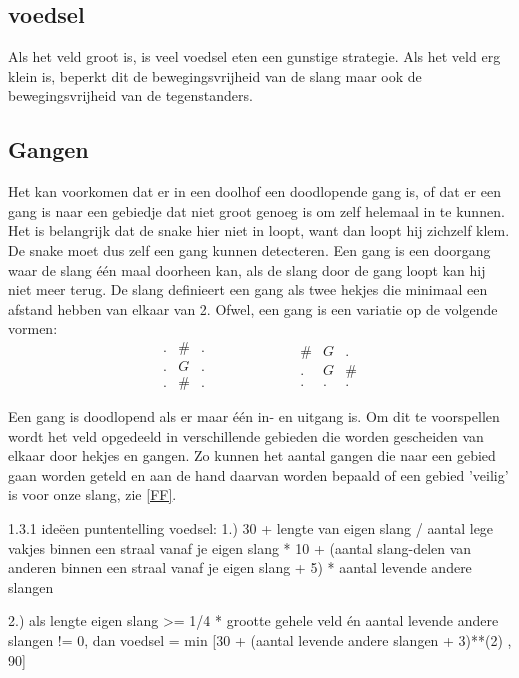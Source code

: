 \documentclass{article}
\begin{document}
\subsection{voedsel}
Als het veld groot is, is veel voedsel eten een gunstige strategie. Als het veld erg klein is, beperkt dit de bewegingsvrijheid van de slang maar ook de bewegingsvrijheid van de tegenstanders.


\subsection{Gangen\label{Gangen}}
Het kan voorkomen dat er in een doolhof een doodlopende gang is, of dat er een gang is naar een gebiedje dat niet groot genoeg is om zelf helemaal in te kunnen. Het is belangrijk dat de snake hier niet in loopt, want dan loopt hij zichzelf klem. De snake moet dus zelf een gang kunnen detecteren. Een gang is een doorgang waar de slang \'e\'en maal doorheen kan, als de slang door de gang loopt kan hij niet meer terug. De slang definieert een gang als twee hekjes die minimaal een afstand hebben van elkaar van 2. Ofwel, een gang is een variatie op de volgende vormen:
\begin{equation}
\begin{matrix}
. & \# & .\\
. & G& . \\
. & \# & . 
\end{matrix} \qquad \qquad \qquad 
\begin{matrix}
\# & G & . \\
. & G & \# \\
. & . & . 
\end{matrix}
\end{equation}

Een gang is doodlopend als er maar \'e\'en in- en uitgang is. Om dit te voorspellen wordt het veld opgedeeld in verschillende gebieden die worden gescheiden van elkaar door hekjes en gangen. Zo kunnen het aantal gangen die naar een gebied gaan worden geteld en aan de hand daarvan worden bepaald of een gebied 'veilig' is voor onze slang, zie \ref{FF}.


1.3.1 ideëen puntentelling voedsel:
1.)
30 + {lengte van eigen slang} / {aantal lege vakjes binnen een straal vanaf je eigen slang} * 10 
    + ({aantal slang-delen van anderen binnen een straal vanaf je eigen slang} + 5) * {aantal levende andere slangen}
        
2.)
als {lengte eigen slang} >= 1/4 * {grootte gehele veld} én {aantal levende andere slangen} != 0,
dan voedsel = min [30 + ({aantal levende andere slangen} + 3)**(2) , 90]
      
\end{document}
